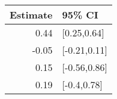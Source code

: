 \begin{tabular}{rl}
  \hline
Estimate & 95\% CI \\ 
  \hline
0.44 & [0.25,0.64] \\ 
  -0.05 & [-0.21,0.11] \\ 
  0.15 & [-0.56,0.86] \\ 
  0.19 & [-0.4,0.78] \\ 
   \hline
\end{tabular}

